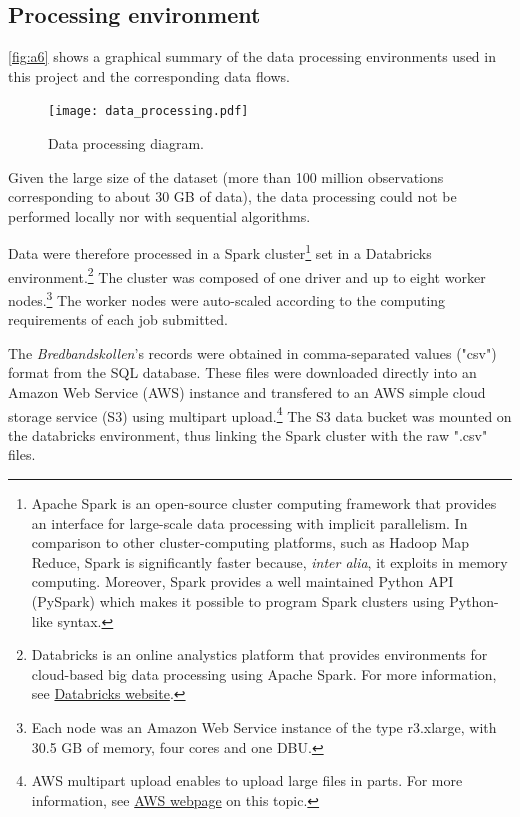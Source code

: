 \documentclass[12pt]{article}
\begin{document}
\subsection{Processing environment}

\autoref{fig:a6} shows a graphical summary of the data processing environments used in this project and the corresponding data flows.

\begin{figure}[H]
    \centering
        \texttt{[image: data\_processing.pdf]}
        \caption{Data processing diagram.}
        \label{fig:a6}
\end{figure}   

Given the large size of the dataset (more than 100 million observations corresponding to about 30 GB of data), the data processing could not be performed locally nor with sequential algorithms.     

Data were therefore processed in a Spark cluster\footnote{Apache Spark is an open-source cluster computing framework that provides an interface for large-scale data processing with implicit parallelism. In comparison to other cluster-computing platforms, such as Hadoop Map Reduce, Spark is significantly faster because, \textit{inter alia}, it exploits in memory computing. Moreover, Spark provides a well maintained Python API (PySpark) which makes it possible to program Spark clusters using Python-like syntax.} set in a Databricks environment.\footnote{Databricks is an online analystics platform that provides environments for cloud-based big data processing using Apache Spark. For more information, see \href{https://databricks.com/}{Databricks website}.} The cluster was composed of one driver and up to eight worker nodes.\footnote{Each node was an Amazon Web Service instance of the type r3.xlarge, with 30.5 GB of memory, four cores and one DBU.} The worker nodes were auto-scaled according to the computing requirements of each job submitted.  

The \textit{Bredbandskollen}'s records were obtained in comma-separated values ("csv") format from the SQL database. These files were downloaded directly into an Amazon Web Service (AWS) instance and transfered to an AWS simple cloud storage service (S3) using multipart upload.\footnote{AWS multipart upload enables to upload large files in parts. For more information, see \href{http://docs.aws.amazon.com/AmazonS3/latest/dev/mpuoverview.html}{AWS webpage} on this topic.} The S3 data bucket was mounted on the databricks environment, thus linking the Spark cluster with the raw ".csv" files.
\end{document}
